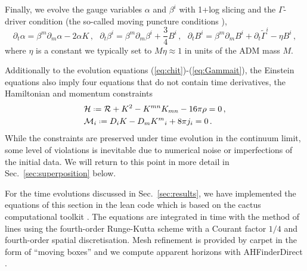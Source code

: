 \documentclass[]{iopart}
\newcommand{\us}[1]{\textcolor{teal}{[{\it\textbf{US: #1}}]} }
\renewcommand{\mr}[1]{\textcolor{purple}{[{\it\textbf{MR: #1}}]} }
\newcommand*{\defeq}{\mathrel{\vcenter{\baselineskip0.5ex \lineskiplimit0pt
                     \hbox{\scriptsize.}\hbox{\scriptsize.}}}%
                     =}
\begin{document}
Finally, we evolve the gauge variables $\alpha$ and $\beta^i$
with 1+log slicing and the $\Gamma$-driver condition
(the so-called moving puncture conditions
\cite{Campanelli:2005dd,Baker:2005vv}),
%
\begin{equation}
  \partial_t \alpha = \beta^m \partial_m \alpha
  -2\alpha K
  \,,~~~
  \partial_t \beta^i = \beta^m\partial_m \beta^i
  +\frac{3}{4}B^i
  \,,~~~
  \partial_t B^i = \beta^m \partial_m B^i
  +\partial_t \tilde{\Gamma}^i
  -\eta B^i\,,
\end{equation}
%
where $\eta$ is a constant we typically set to $M\eta\approx 1$
in units of the ADM mass $M$.

Additionally to the evolution equations (\ref{eq:chit})-(\ref{eq:Gammait}),
the Einstein equations also imply four equations that do not contain time
derivatives, the Hamiltonian and momentum constraints
%
\begin{align}
  &\mathcal{H} \defeq \mathcal{R}+K^2-K^{mn}K_{mn} - 16\pi \rho = 0\,,
  \label{eq:ham} \\
  &\mathcal{M}_i\defeq D_i K - D_m K^m{}_i + 8\pi j_i = 0\,.
  \label{eq:mom}
\end{align}
%
While the constraints are preserved under time evolution in the continuum limit,
some level of violations is inevitable due to numerical noise or imperfections
of the initial data. We will return to this point in more detail in
Sec.~\ref{sec:superposition} below.

For the time evolutions discussed in Sec.~\ref{sec:results},
we have implemented the equations of this section in the
{\sc lean} code \cite{Sperhake:2006cy} which is based on the
{\sc cactus} computational toolkit \cite{Allen:1999}. The
equations are integrated in time with the method of lines
using the fourth-order Runge-Kutta scheme with a
Courant factor $1/4$ and fourth-order
spatial discretisation. Mesh refinement is provided by
{\sc carpet} \cite{Schnetter:2003rb} in the form of ``moving
boxes'' and we compute apparent horizons with
{\sc AHFinderDirect} \cite{Thornburg:1995cp,Thornburg:2003sf}.
\end{document}
